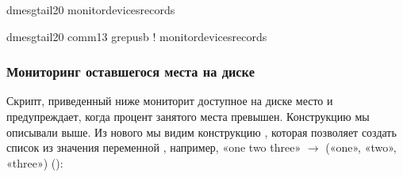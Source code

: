 \documentclass[letterpaper,10pt,russian]{sphinxmanual}
\begin{document}
\begin{sphinxVerbatim}[commandchars=\\\{\}]
dmesgtail\PYGZhy{}20
monitor\PYGZus{}devices\PYGZus{}records

dmesgtail\PYGZhy{}20
comm\PYGZhy{}13\PYGZlt{}\PYGZlt{}
grepusb
!
monitor\PYGZus{}devices\PYGZus{}records
\end{sphinxVerbatim}


\subsubsection{Мониторинг оставшегося места на диске}
\label{\detokenize{educational_materials/bash/content:id5}}
\sphinxAtStartPar
Скрипт, приведенный ниже мониторит доступное на диске место и предупреждает, когда процент занятого места превышен. Конструкцию \sphinxcode{\sphinxupquote{\$\{\}}} мы описывали выше. Из нового мы видим конструкцию , которая позволяет создать список из значения переменной , например, «one two three» \(\rightarrow\) («one», «two», «three») ():
\end{document}
